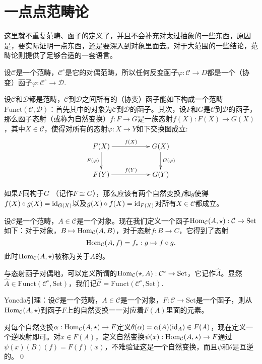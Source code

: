 \appendix
\renewcommand{\thepara}{\Alph{chapter}.\arabic{para}}
\renewcommand\chapterimg{Pictures/5.png}
\chapter{一点点范畴论}

这里就不重复范畴、函子的定义了，并且不会补充对太过抽象的一些东西，原因是，要实际证明一点东西，还是要深入到对象里面去。对于大范围的一些结论，范畴论则提供了足够合适的一套语言。

 设$\mathcal{C}$是一个范畴，$\mathcal{C}^\circ$是它的对偶范畴，所以任何反变函子$\varphi:\mathcal{C}\to D$都是一个（协变）函子$\varphi:\mathcal{C}^\circ\to \mathcal{D}$.

 设$\mathcal{C}$和$\mathcal{D}$都是范畴，$\mathcal{C}$到$\mathcal{D}$之间所有的（协变）函子能如下构成一个范畴$\text{Funct}(\mathcal{C},\mathcal{D})$：首先其中的对象为$\mathcal{C}$到$\mathcal{D}$的函子。其次，设$F$和$G$是$\mathcal{C}$到$\mathcal{D}$的函子，那么函子态射（或称为自然变换）$f:F\to G$是一族态射$f(X):F(X)\to G(X)$，其中$X\in \mathcal{C}$，使得对所有的态射$\varphi:X\to Y$如下交换图成立:
\[
\xymatrix{
		F(X)\ar[rr]^{f(X)} \ar[d]_{F(\varphi)}&&G(X) \ar[d]^{G(\varphi)}\\
		F(Y)\ar[rr]^{f(Y)}&&G(Y)
	}
\]

如果$F$同构于$G$ （记作$F\cong G$），那么应该有两个自然变换$f$和$g$使得$f(X)\circ g(X)=\operatorname{id}_{G(X)}$以及$g(X)\circ f(X)=\operatorname{id}_{F(X)}$对所有$X\in \mathcal{C}$都成立。

\para 设$\mathcal{C}$是一个范畴，$A\in \mathcal{C}$是一个对象。现在我们定义一个函子$\operatorname{Hom}_\mathcal{C}(A,\star):\mathcal{C}\to \text{Set}$如下：对于对象，$B\mapsto \operatorname{Hom}_\mathcal{C}(A,B)$，对于态射$f:B\to C$，它得到了态射
\[
	\operatorname{Hom}_\mathcal{C}(A,f)=f_*: g\mapsto f\circ g.
\]
此时$\operatorname{Hom}_\mathcal{C}(A,\star)$被称为关于$A$的。

与态射函子对偶地，可以定义所谓的$\operatorname{Hom}_\mathcal{C}(\star,A):\mathcal{C}^{\circ}\to \text{Set}$，它记作$\hat{A}$。显然$\hat{A}\in \text{Funct}(\mathcal{C}^\circ,\text{Set})$，我们记$\hat{\mathcal{C}}=\text{Funct}(\mathcal{C}^\circ,\text{Set})$.

\lem Yoneda引理：设$\mathcal{C}$是一个范畴，$A\in \mathcal{C}$是一个对象，$F:\mathcal{C}\to \text{Set}$是一个函子，则从$\operatorname{Hom}_\mathcal{C}(A,\star)$到函子$F$上的自然变换一一对应着$F(A)$里面的元素。

\proof 对每个自然变换$\alpha:\operatorname{Hom}_\mathcal{C}(A,\star)\to F$定义$\theta(\alpha)=\alpha(A)(\operatorname{id}_A)\in F(A)$，现在定义一个逆映射即可。对$x\in F(A)$，定义自然变换$\psi(x):\operatorname{Hom}_\mathcal{C}(A,\star)\to F$通过$\psi(x)(B)(f)=F(f)(x)$，不难验证这是一个自然变换，而且$\psi$和$\theta$是互逆的。\qed

